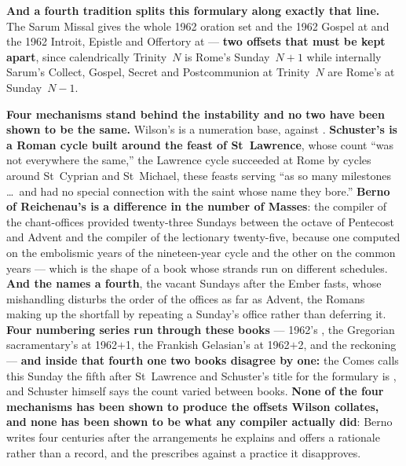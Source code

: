 \textbf{And a fourth tradition splits this formulary along exactly that line.}
The Sarum Missal gives the whole 1962 oration set and the 1962 Gospel at
 and the 1962 Introit, Epistle and Offertory
at  --- \textbf{two offsets that must be kept apart}, since
calendrically Trinity~$N$ is Rome's Sunday~$N{+}1$ while internally Sarum's
Collect, Gospel, Secret and Postcommunion at Trinity~$N$ are Rome's at
Sunday~$N{-}1$.

\textbf{Four mechanisms stand behind the instability and no two have been shown
to be the same.} Wilson's is a numeration base,  against
. \textbf{Schuster's is a Roman cycle built
around the feast of St~Lawrence}, whose count ``was not everywhere the same,''
the Lawrence cycle succeeded at Rome by cycles around St~Cyprian and St~Michael,
these feasts serving ``as so many milestones \dots\ and had no special
connection with the saint whose name they bore.'' \textbf{Berno of Reichenau's
is a difference in the number of Masses}: the compiler of the chant-offices
provided twenty-three Sundays between the octave of Pentecost and Advent and the
compiler of the lectionary twenty-five, because one computed on the embolismic
years of the nineteen-year cycle and the other on the common years --- which is
the shape of a book whose strands run on different schedules. \textbf{And the
 names a fourth}, the vacant Sundays after the Ember fasts,
whose mishandling disturbs the order of the offices as far as Advent, the Romans
making up the shortfall by repeating a Sunday's office rather than deferring it. \textbf{Four numbering series run through these
books} --- 1962's , the Gregorian sacramentary's at
1962$+$1, the Frankish Gelasian's at 1962$+$2, and the  reckoning --- \textbf{and inside that fourth one two books disagree
by one:} the Comes calls this Sunday the
fifth after St~Lawrence and Schuster's title for the formulary is , and Schuster himself says the count varied between
books. \textbf{None of the four mechanisms has been shown to produce the
offsets Wilson collates, and none has been shown to be what any compiler
actually did}: Berno writes four centuries after the arrangements he explains
and offers a rationale rather than a record, and the 
prescribes against a practice it disapproves.

